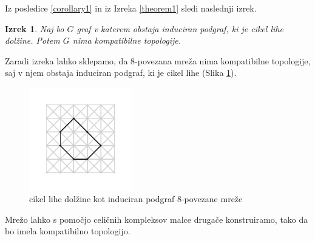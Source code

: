 \documentclass[a4paper, 12pt]{book}
\newtheorem{theorem}{Izrek}[section]
\theoremstyle{definition}
\theoremstyle{remark}
\begin{document}
Iz posledice \ref*{corollary1} in iz Izreka \ref*{theorem1} sledi naslednji izrek.
\begin{theorem}
Naj bo $G$ graf v katerem obstaja induciran podgraf, ki je cikel lihe dolžine. Potem
$G$ nima kompatibilne topologije.
\end{theorem}
Zaradi izreka lahko sklepamo, da 8-povezana mreža nima kompatibilne topologije,
saj v njem obstaja induciran podgraf, ki je cikel lihe (Slika \ref{oddCircle}).
\begin{figure}
  \begin{center}
  \includegraphics[width=0.4\textwidth]{odd_circle.pdf}
  \end{center}
  \caption{cikel lihe dolžine kot induciran podgraf 8-povezane mreže}
  \label{oddCircle}
\end{figure}
Mrežo lahko s pomočjo celičnih kompleksov malce drugače konstruiramo, tako
da bo imela kompatibilno topologijo.
\end{document}
